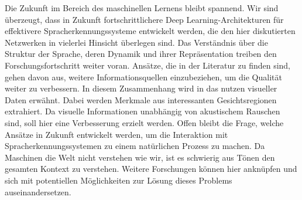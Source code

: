 Die Zukunft im Bereich des maschinellen Lernens bleibt spannend. Wir sind überzeugt, dass in Zukunft fortschrittlichere Deep Learning-Architekturen für effektivere Spracherkennungssysteme entwickelt werden, die den hier diskutierten Netzwerken in vielerlei Hinsicht überlegen sind. Das Verständnis über die Struktur der Sprache, deren Dynamik und ihrer Repräsentation treiben den Forschungsfortschritt weiter voran. Ansätze, die in der Literatur zu finden sind, gehen davon aus, weitere Informationsquellen einzubeziehen, um die Qualität weiter zu verbessern. In diesem Zusammenhang wird in {\cite{Yu.2014}} das nutzen visueller Daten erwähnt. Dabei werden Merkmale aus interessanten Gesichtsregionen extrahiert. Da visuelle Informationen unabhängig von akustischem Rauschen sind, soll hier eine Verbesserung erzielt werden. Offen bleibt die Frage, welche Ansätze in Zukunft entwickelt werden, um die Interaktion mit Spracherkennungssystemen zu einem natürlichen Prozess zu machen. Da Maschinen die Welt nicht verstehen wie wir, ist es schwierig aus Tönen den gesamten Kontext zu verstehen. Weitere Forschungen können hier anknüpfen und sich mit potentiellen Möglichkeiten zur Lösung dieses Problems auseinandersetzen.

\ifCLASSOPTIONcaptionsoff
  \newpage
\fi